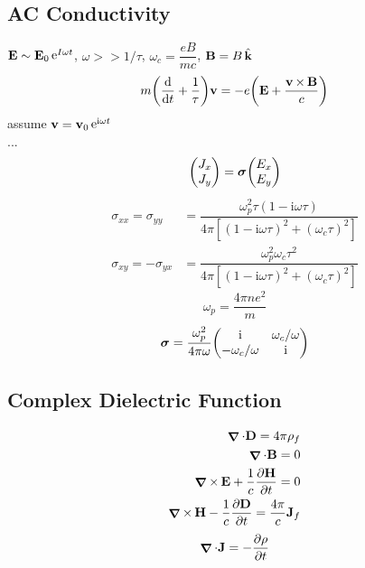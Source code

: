 \documentclass[UTF8]{ctexart} %
\DeclareMathOperator{\ti}{\times}
\DeclareMathOperator{\e}{\mathrm{e}}
\renewcommand{\I}{\mathrm{i}}
\DeclareMathOperator{\na}{\bm{\nabla}}
\DeclareMathOperator{\hk}{\hat{\vb{k}}}
\numberwithin{equation}{section}
\begin{document}
\subsection{AC Conductivity}
$ \vb{E} \sim \vb{E}_0 \e^{\-I\omega t} $, $ \omega >> 1/\tau $, $ \omega_c = \dfrac{e B}{m c} $, $ \vb{B} = B\hk $
\begin{equation}\label{key}
m\qty(\dv{t} + \dfrac{1}{\tau})\vb{v} = -e\qty(\vb{E} + \dfrac{\vb{v}\ti\vb{B}}{c})
\end{equation}
assume $ \vb{v} = \vb{v}_0\e^{\I\omega t} $\\
...
\begin{equation}\label{key}
\mqty(J_x\\ J_y) = \bm{\sigma}\mqty(E_x\\ E_y)
\end{equation}
\begin{equation}\label{key}
\begin{aligned}
\sigma_{xx} = \sigma_{yy} &= \dfrac{\omega_p^2\tau(1 - \I\omega\tau)}{4\pi[(1 - \I\omega\tau)^2 + (\omega_c\tau)^2]}\\
\sigma_{xy} = -\sigma_{yx} &= \dfrac{\omega_p^2\omega_c\tau^2}{4\pi[(1 - \I\omega\tau)^2 + (\omega_c\tau)^2]}
\end{aligned}
\end{equation}
\begin{equation}\label{key}
\omega_p = \dfrac{4\pi ne^2}{m}
\end{equation}
\begin{equation}\label{key}
\bm{\sigma} = \dfrac{\omega_p^2}{4\pi\omega}\mqty(\I & \omega_c/\omega\\ -\omega_c/\omega & \I) 
\end{equation}

\subsection{Complex Dielectric Function}
\begin{equation}\label{key}
\begin{aligned}
\na\cdot\vb{D} = 4\pi\rho_f\\
\na\cdot\vb{B} = 0\\
\na\ti\vb{E} + \dfrac{1}{c}\pdv{\vb{H}}{t} = 0\\
\na\ti\vb{H} - \dfrac{1}{c}\pdv{\vb{D}}{t} = \dfrac{4\pi}{c}\vb{J}_f
\end{aligned}
\end{equation}
\begin{equation}\label{key}
\na\cdot\vb{J} = -\pdv{\rho}{t}
\end{equation}
\end{document}
